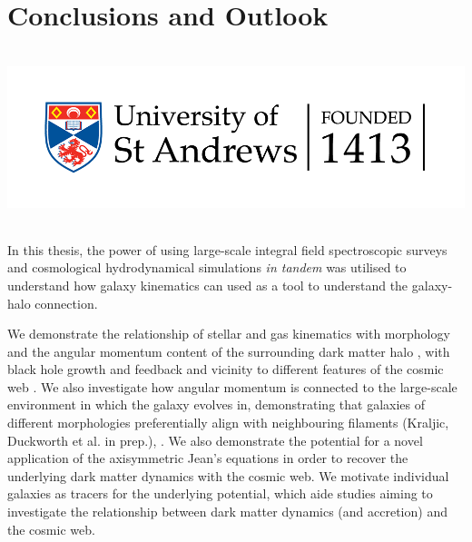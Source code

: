 \chapter{Conclusions and Outlook}
\vspace{-5in}
\includegraphics[height=2.0in]{thesis/latex/st_a_logo_.png}
\vspace{3in}

In this thesis, the power of using large-scale integral field spectroscopic surveys and cosmological hydrodynamical simulations \textit{in tandem} was utilised to understand how galaxy kinematics can used as a tool to understand the galaxy-halo connection. 

We demonstrate the relationship of stellar and gas kinematics with morphology and the angular momentum content of the surrounding dark matter halo \citep{duckworth2020a}, with black hole growth and feedback \citep{duckworth2020b} and vicinity to different features of the cosmic web \citep{duckworth2019}. We also investigate how angular momentum is connected to the large-scale environment in which the galaxy evolves in, demonstrating that galaxies of different morphologies preferentially align with neighbouring filaments (Kraljic, Duckworth et al. in prep.), . We also demonstrate the potential for a novel application of the axisymmetric Jean's equations in order to recover the underlying dark matter dynamics with the cosmic web. We motivate individual galaxies as tracers for the underlying potential, which aide studies aiming to investigate the relationship between dark matter dynamics (and accretion) and the cosmic web.
